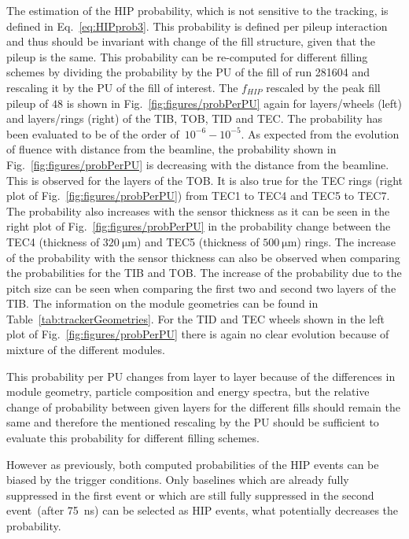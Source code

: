 The estimation of the HIP probability, which is not sensitive to the tracking, is defined in Eq.~\ref{eq:HIPprob3}. This probability is defined per pileup interaction and thus should be invariant with change of the fill structure, given that the pileup is the same. This probability can be re-computed for different filling schemes by dividing the probability by the PU of the fill of run 281604 and rescaling it by the PU of the fill of interest. The $f_{HIP}$ rescaled by the peak fill pileup of $48$ is shown in Fig.~\ref{fig:figures/probPerPU} again for layers/wheels (left) and layers/rings (right) of the TIB, TOB, TID and TEC. The probability has been evaluated to be of the order of~$10^{-6}-10^{-5}$.  As expected from the evolution of fluence with distance from the beamline, the probability shown in Fig.~\ref{fig:figures/probPerPU} is decreasing with the distance from the beamline. This is observed for the layers of the TOB. It is also true for the TEC rings (right plot of Fig.~\ref{fig:figures/probPerPU}) from TEC1 to TEC4 and TEC5 to TEC7. The probability also increases with the sensor thickness as it can be seen in the right plot of Fig.~\ref{fig:figures/probPerPU} in the probability change between the TEC4 (thickness of $320~\mathrm{\mu m}$) and TEC5 (thickness of $500~\mathrm{\mu m}$) rings.  The increase of the probability with the sensor thickness can also be observed when comparing the probabilities for the TIB and TOB.  The increase of the probability due to the pitch size can be seen when comparing the first two and second two layers of the TIB. The information on the module geometries can be found in Table~\ref{tab:trackerGeometries}.  For the TID and TEC wheels shown in the left plot of Fig.~\ref{fig:figures/probPerPU} there is again no clear evolution because of mixture of the different modules. 

This probability per PU changes from layer to layer because of the differences in module geometry, particle composition and energy spectra, but the relative change of probability between given layers for the different fills should remain the same and therefore the mentioned rescaling by the PU should be sufficient to evaluate this probability for different filling schemes.


However as previously, both computed probabilities of the HIP events can be biased by the trigger conditions. Only baselines which are already fully suppressed in the first event or which are still fully suppressed in the second event~(after 75~ns) can be selected as HIP events, what potentially decreases the probability.

